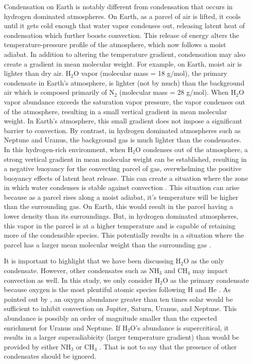 \documentclass[11pt]{ucscthesisbs}
\begin{document}
Condensation on Earth is notably different from condensation that occurs in hydrogen dominated atmospheres. On Earth, as a parcel of air is lifted, it cools until it gets cold enough that water vapor condenses out, releasing latent heat of condensation which further boosts convection. This release of energy alters the temperature-pressure profile of the atmosphere, which now follows a moist adiabat.  In addition to altering the temperature gradient, condensation may also create a gradient in mean molecular weight. For example, on Earth, moist air is lighter than dry air. H$_{2}$O vapor (molecular mass = 18 g/mol), the primary condensate in Earth's atmosphere, is lighter (not by much) than the background air which is composed primarily of N$_{2}$ (molecular mass = 28 g/mol). When H$_{2}$O vapor abundance exceeds the saturation vapor pressure, the vapor condenses out of the atmosphere, resulting in a small vertical gradient in mean molecular weight. In Earth's atmosphere, this small gradient does not impose a significant barrier to convection. By contrast, in hydrogen dominated atmospheres such as Neptune and Uranus, the background gas is much lighter than the condensates. In this hydrogen-rich environment, when H$_{2}$O condenses out of the atmosphere, a strong vertical gradient in mean molecular weight can be established, resulting in a negative buoyancy for the convecting parcel of gas, overwhelming the positive buoyancy effects of latent heat release. This can create a situation where the zone in which water condenses is stable against convection \citep{guillot_1995,friedson_2017,leconte_2017}. This situation can arise because as a parcel rises along a moist adiabat, it's temperature will be higher than the surrounding gas. On Earth, this would result in the parcel having a lower density than its surroundings. But, in hydrogen dominated atmospheres, this vapor in the parcel is at a higher temperature and is capable of retaining more of the condensible species. This potentially results in a situation where the parcel has a larger mean molecular weight than the surrounding gas \citep{leconte_2017}.

It is important to highlight that we have been discussing H$_{2}$O as the only condensate. However, other condensates such as NH$_{3}$ and CH$_{4}$ may impact convection as well. In this study, we only consider H$_{2}$O as the primary condensate because oxygen is the most plentiful atomic species following H and He \citep{leconte_2017}. As pointed out by \citep{guillot_1995}, an oxygen abundance greater than ten times solar would be sufficient to inhibit convection on Jupiter, Saturn, Uranus, and Neptune. This abundance is possibly an order of magnitude smaller than the expected enrichment for Uranus and Neptune. If H$_{2}$O's abundance is supercritical, it results in a larger superadiabicity (larger temperature gradient) than would be provided by either NH$_{3}$ or CH$_{4}$ \citep{guillot_1995}. That is not to say that the presence of other condensates should be ignored. 
\end{document}
